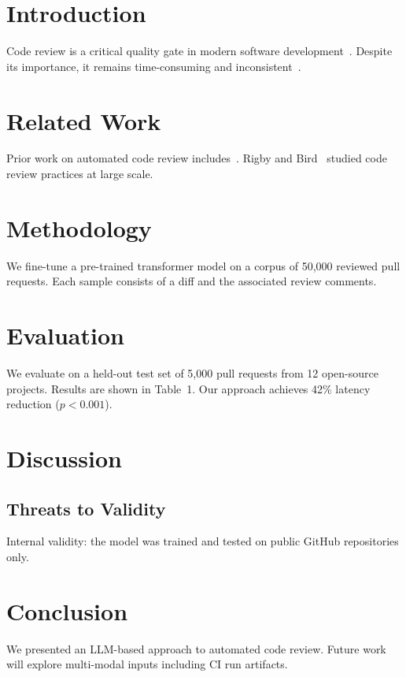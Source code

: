 \documentclass[10pt,conference]{IEEEtran}
\begin{document}
\begin{abstract}
We present a novel approach to automated code review using large language models.
Our method achieves 42\% reduction in review latency with no loss in defect detection.
\end{abstract}

\section{Introduction}
Code review is a critical quality gate in modern software development~\cite{rigby2013,bacchelli2013}.
Despite its importance, it remains time-consuming and inconsistent~\cite{sadowski2018}.

\section{Related Work}
Prior work on automated code review includes~\cite{smith2022,jones2021}.
Rigby and Bird~\cite{rigby2013} studied code review practices at large scale.

\section{Methodology}
We fine-tune a pre-trained transformer model on a corpus of 50,000 reviewed pull requests.
Each sample consists of a diff and the associated review comments.

\section{Evaluation}
We evaluate on a held-out test set of 5,000 pull requests from 12 open-source projects.
Results are shown in Table~1. Our approach achieves 42\% latency reduction ($p < 0.001$).

\section{Discussion}
\subsection{Threats to Validity}
Internal validity: the model was trained and tested on public GitHub repositories only.

\section{Conclusion}
We presented an LLM-based approach to automated code review.
Future work will explore multi-modal inputs including CI run artifacts.


\end{document}
